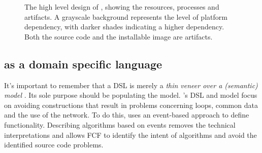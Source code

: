 \documentclass[3p,times,procedia]{elsarticle}
\begin{document}
\begin{figure}[t]
  \centering
\caption{The high level design of \FOO, showing the resources, processes and
artifacts. A grayscale background represents the level of platform dependency,
with darker shades indicating a higher dependency. Both the source code and the
installable image are artifacts.}
\label{fig:design}
\end{figure}

\subsection{\FOO as a domain specific language}
\label{dsl-design}

It's important to remember that a DSL is merely a \emph{thin veneer over a
(semantic) model} \cite{fowler2010domain}. Its sole purpose should be
populating the model. \FOO's DSL and model focus on avoiding constructions that
result in problems concerning loops, common data and the use of the network. To
do this, \FOO uses an event-based approach to define functionality. Describing
algorithms based on events removes the technical interpretations and allows FCF
to identify the intent of algorithms and avoid the identified source code
problems.
\end{document}
